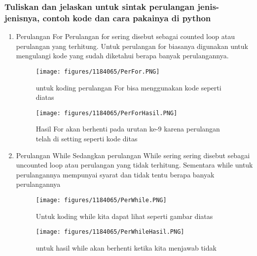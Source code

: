 \subsubsection{Tuliskan dan jelaskan untuk sintak perulangan jenis-jenisnya, contoh kode dan cara pakainya di python }
\begin{enumerate}
\item Perulangan For
\hfill \break
Perulangan for sering disebut sebagai counted loop atau perulangan yang terhitung. Untuk perulangan for biasanya digunakan untuk mengulangi kode yang sudah diketahui berapa banyak perulangannya.
\begin{figure}[H]
		\texttt{[image: figures/1184065/PerFor.PNG]}
		\centering
		\caption{untuk koding perulangan  For bisa menggunakan kode seperti diatas}
\end{figure}
\begin{figure}[H]
		\texttt{[image: figures/1184065/PerForHasil.PNG]}
		\centering
		\caption{Hasil For akan berhenti pada urutan ke-9 karena perulangan telah di setting seperti kode ditas}
\end{figure}
\item Perulangan While
\hfill \break
Sedangkan perulangan While sering sering disebut sebagai uncounted loop atau perulangan yang tidak terhitung. Sementara while untuk perulangannya mempunyai syarat dan tidak tentu berapa banyak perulangannya
\begin{figure}[H]
		\texttt{[image: figures/1184065/PerWhile.PNG]}
		\centering
		\caption{Untuk koding while kita dapat lihat seperti gambar diatas}
\end{figure}
\begin{figure}[H]
		\texttt{[image: figures/1184065/PerWhileHasil.PNG]}
		\centering
		\caption{untuk hasil while akan berhenti ketika kita menjawab tidak}
\end{figure}

\end{enumerate}
